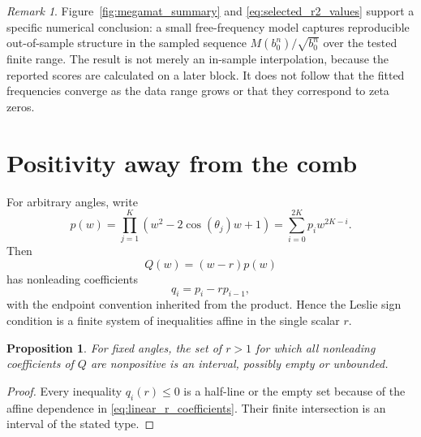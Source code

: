 \documentclass[11pt]{amsart}
\numberwithin{equation}{section}
\theoremstyle{plain}
\newtheorem{proposition}[theorem]{Proposition}
\theoremstyle{definition}
\theoremstyle{remark}
\newtheorem{remark}[theorem]{Remark}
\begin{document}
\begin{remark}
\label{rem:interpretation_free_prediction}
Figure~\ref{fig:megamat_summary} and \eqref{eq:selected_r2_values} support a specific numerical conclusion: a small free-frequency model captures reproducible out-of-sample structure in the sampled sequence $M(b_0^n)/\sqrt{b_0^n}$ over the tested finite range.  The result is not merely an in-sample interpolation, because the reported scores are calculated on a later block.  It does not follow that the fitted frequencies converge as the data range grows or that they correspond to zeta zeros.
\end{remark}

\section{Positivity away from the comb}
\label{sec:positivity_away_comb}

For arbitrary angles, write
\begin{equation}
p(w)=\prod_{j=1}^{K}\left(w^2-2\cos(\theta_j)w+1\right)
=\sum_{i=0}^{2K}p_i w^{2K-i}.
\label{eq:unit_circle_polynomial}
\end{equation}
Then
\begin{equation}
Q(w)=(w-r)p(w)
\label{eq:scaled_characteristic_polynomial}
\end{equation}
has nonleading coefficients
\begin{equation}
q_i=p_i-rp_{i-1},
\label{eq:linear_r_coefficients}
\end{equation}
with the endpoint convention inherited from the product.  Hence the Leslie sign condition is a finite system of inequalities affine in the single scalar $r$.

\begin{proposition}
\label{prop:positivity_interval}
For fixed angles, the set of $r>1$ for which all nonleading coefficients of $Q$ are nonpositive is an interval, possibly empty or unbounded.
\end{proposition}

\begin{proof}
Every inequality $q_i(r)\leq0$ is a half-line or the empty set because of the affine dependence in \eqref{eq:linear_r_coefficients}.  Their finite intersection is an interval of the stated type.
\end{proof}
\end{document}
